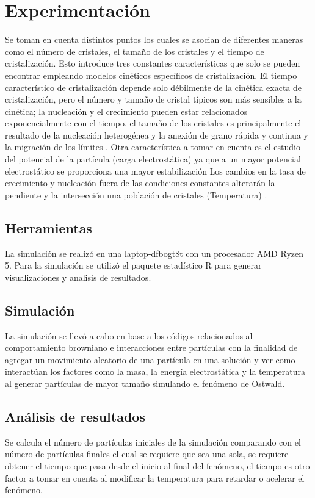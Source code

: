 \documentclass[3pt,twocolumn]{elsarticle}
\begin{document}
\section{Experimentación}
Se toman en cuenta distintos puntos los cuales se asocian de diferentes maneras como el número de cristales, el tamaño de los cristales y el tiempo de cristalización. Esto introduce tres constantes características que solo se pueden encontrar empleando modelos cinéticos específicos de cristalización. El tiempo característico de cristalización depende solo débilmente de la cinética exacta de cristalización, pero el número y tamaño de cristal típicos son más sensibles a la cinética; la nucleación y el crecimiento pueden estar relacionados exponencialmente con el tiempo, el tamaño de los cristales es principalmente el resultado de la nucleación heterogénea y la anexión de grano rápida y continua y la migración de los límites \cite{a8}. Otra característica a tomar en cuenta es el estudio del potencial de la partícula (carga electrostática) ya que a un mayor potencial electrostático se proporciona una mayor estabilización \cite{a11,a12} Los cambios en la tasa de crecimiento y nucleación fuera de las condiciones constantes alterarán la pendiente y la intersección una población de cristales (Temperatura) \cite{a13}. 

\subsection{Herramientas}
La simulación se realizó en una laptop-dfbogt8t con un procesador AMD Ryzen 5. Para la simulación se utilizó el paquete estadístico R  \cite{R} para generar visualizaciones y analisis de resultados.

\subsection{Simulación}
La simulación se llevó a cabo en base a los códigos relacionados al comportamiento browniano \cite{p1} e interacciones entre partículas \cite{p7} con la finalidad de agregar un movimiento aleatorio de una partícula en una solución y ver como interactúan los factores como la masa, la energía electrostática y la temperatura al generar partículas de mayor tamaño simulando el fenómeno de Ostwald.

\subsection{Análisis de resultados}
Se calcula el número de partículas iniciales de la simulación comparando con el número de partículas finales el cual se requiere que sea una sola, se requiere obtener el tiempo que pasa desde el inicio al final del fenómeno, el tiempo es otro factor a tomar en cuenta al modificar la temperatura para retardar o acelerar el fenómeno.
\end{document}
